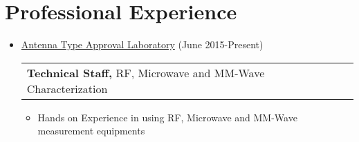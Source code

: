 \documentclass[a4paper,10pt]{article} %
\begin{document}
\color{blue}
\section{Professional Experience}
\color{Black}
\begin{itemize}
				 
		
		\item 
		\href{http://antennalab.ut.ac.ir/}{Antenna Type Approval Laboratory} \hspace{8.2cm}  (June 2015-Present)\\
		\begin{tabular}{ll}
				{\bf Technical Staff, } RF, Microwave and MM-Wave Characterization & \\
		\end{tabular}
		 \begin{itemize}
	 	\item
	 	 Hands on Experience in using RF, Microwave and MM-Wave measurement equipments 
	 	 

\end{itemize}
\end{itemize}
\end{document}
